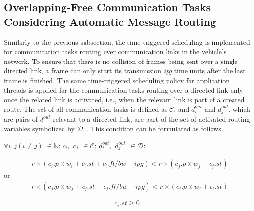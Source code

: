     
    \subsection{Overlapping-Free Communication Tasks Considering Automatic Message Routing}\label{overlapping2}
    Similarly to the previous subsection, the time-triggered scheduling is implemented for communication tasks routing over communication links in the vehicle's network. 
    To ensure that there is no collision of frames being sent over a single directed link, a frame can only start its transmission \textit{ipg} time units after the last frame is finished. The same time-triggered scheduling policy for application threads is applied for the communication tasks routing over a directed link only once the related link is activated, i.e., when the relevant link is part of a created route. The set of all communication tasks is defined as $\mathcal{C}$, and $d_i^{out}$ and $d_j^{out}$, which are pairs of $d^{out}$ relevant to a directed link, are part of the set of activated routing variables symbolized by $\mathcal{D}$~\cite{askaripoor2023designer}. This condition can be formulated as follows.\newline  



$\forall i, j (i \neq j)$ $\in\mathbb{N}$; ${c_i}$,~${c_j}$~$\in\mathcal{C} $; $d_i^{out}$,~$d_j^{out}$~$\in\mathcal{D} $:\newline

\begin{equation}
	\begin{split}
	&r \times ({c_i}.{p} \times {w_i} + {c_i}.{st} + {c_i}.{fl}/bw + ipg) <
	r \times ({c_j}.{p} \times {w_j} +  {c_j}.{st})
	\label{eq10}
\end{split}
\end{equation}
\; \; \; \; \; \; \; \; \; \; \; \; \; \; \; \; \; \; \; \;\; \; \; \; \; \;\; \; \; \; \; \; or
\begin{equation*}
	\begin{split}
	&r \times ({c_j}.{p} \times {w_j} + {c_j}.{st} + {c_j}.{fl}/bw + ipg) <
	r \times ({c_i}.{p} \times {w_i} +  {c_i}.{st})
	\label{}
\end{split}
\end{equation*}

\begin{equation}
	{c_i}.{st} \geq 0  
	\label{eq11}
\end{equation}

